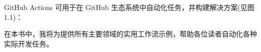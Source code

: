 GitHub Actions 可用于在 GitHub 生态系统中自动化任务，并构建解决方案(见图 1.1)：


在本书中，我将为提供所有主要领域的实用工作流示例，帮助各位读者自动化各种实际开发任务。














